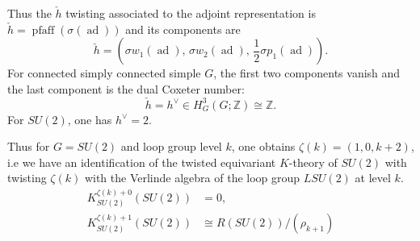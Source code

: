\documentclass[12pt]{article}
\begin{document}
Thus the $\check h$ twisting associated to the adjoint representation is $\check h = \operatorname{pfaff}(\sigma(\operatorname{ad}))$ and its components are
\[
    \check h
    =
    \left(
    \sigma w_1(\operatorname{ad}),\,
    \sigma w_2(\operatorname{ad}),\,
    \frac12\sigma p_1(\operatorname{ad})
    \right).
\]
For connected simply connected simple $G$, the first two components vanish and the last component is the dual Coxeter number:
\[
    \check h=h^\vee\in H^3_G(G;\mathbb Z)\cong \mathbb Z.
\]
For $SU(2)$, one has $h^\vee=2$.

Thus for $G=SU(2)$ and loop group level $k$, one obtains
$\zeta(k) = (1,0,k+2)$, i.e we have an identification of the twisted equivariant $K$-theory of $SU(2)$ with twisting $\zeta(k)$ with the Verlinde algebra of the loop group $LSU(2)$ at level $k$.
\begin{align*}
    K^{\zeta(k)+0}_{SU(2)}(SU(2)) & =0,                         \\
    K^{\zeta(k)+1}_{SU(2)}(SU(2)) & \cong R(SU(2))/(\rho_{k+1})
\end{align*}
\end{document}
